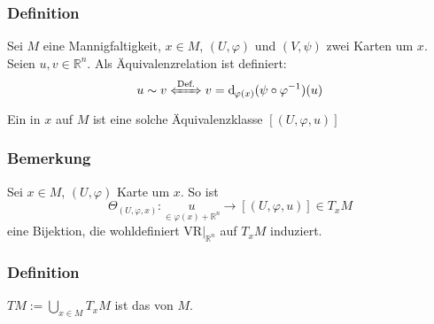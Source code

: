 \subsubsection{Definition}
\label{ssub:130}
Sei $M$ eine Mannigfaltigkeit, $x\in M$, $(U,\varphi)$ und $(V,\psi)$ zwei Karten um $x$. Seien $u,v\in \mathds{R}^n$. Als Äquivalenzrelation ist definiert:
\[
u \sim v \xLeftrightarrow{\text{Def.}} v = \mathd_{\varphi(x)}(\psi \circ \varphi^{-1})(u)
\]
Ein  in $x$ auf $M$ ist eine solche Äquivalenzklasse $[(U,\varphi,u)]$
\missingfigure{}

\subsubsection{Bemerkung}
\label{ssub:131}
Sei $x\in M$, $(U,\varphi)$ Karte um $x$. So ist
\[
\Theta_{(U,\varphi,x)}: \underset{\in \varphi(x) + \mathds{R}^n}{u} \to [(U,\varphi,u)]\in T_x M
\]
eine Bijektion, die wohldefiniert $\text{VR}\vert_{\mathds{R}^n}$ auf $T_x M$ induziert.

\subsubsection{Definition}
\label{ssub:132}
$TM := \bigcup_{x\in M} T_x M$ ist das  von $M$.


